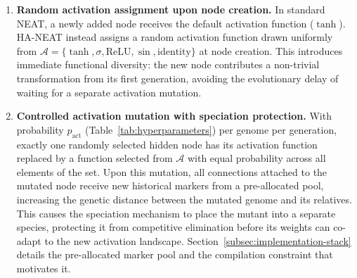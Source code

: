 \documentclass[12pt]{article}
\newcommand{\revTerm}[2]{#2}
\begin{document}
\begin{enumerate}
    \item \textbf{Random activation assignment upon node creation.} In standard NEAT, a newly added node receives the default activation function ($\tanh$). HA-NEAT instead assigns a random activation function drawn uniformly from $\mathcal{A} = \{\tanh, \sigma, \text{ReLU}, \sin, \text{identity}\}$ at node creation. This introduces immediate functional diversity: the new node contributes a non-trivial transformation from its first generation, avoiding the evolutionary delay of waiting for a separate activation mutation.
    
    \item \textbf{Controlled activation mutation with speciation protection.} With probability $p_{\text{act}}$ (Table~\ref{tab:hyperparameters}) per genome per generation, exactly one randomly selected hidden node has its activation function replaced by a function selected from
    $\mathcal{A}$ with equal probability \revTerm{T-06}{across all elements of the set}. Upon this mutation, all connections attached to the mutated node receive new historical markers from a pre-allocated pool, increasing the genetic distance between the mutated genome and its relatives. This causes the speciation mechanism to place the mutant into a separate species, protecting it from competitive elimination before its weights can co-adapt to the new activation landscape. Section~\ref{subsec:implementation-stack} details the pre-allocated marker pool and the compilation constraint that motivates it.
    

\end{enumerate}
\end{document}
